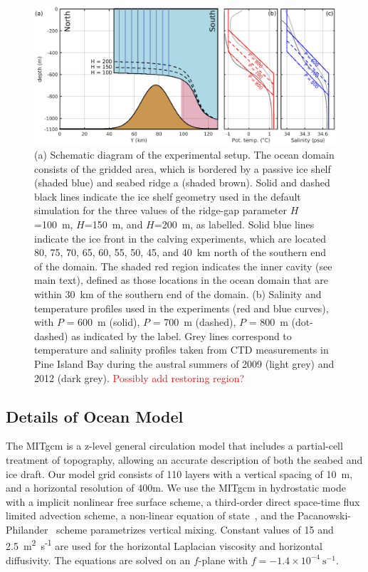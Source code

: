 \documentclass[draft]{agujournal2019}
\newcommand{\red}[1]{\textcolor{red}{#1}}
\begin{document}
\begin{figure}
    \centering
    \includegraphics[width = \textwidth]{../make_figures/plots/figure2.eps}
    \caption{(a) Schematic diagram of the experimental setup. The ocean domain consists of the gridded area, which is bordered by a passive ice shelf (shaded blue) and seabed ridge a (shaded brown). Solid and dashed black lines indicate the ice shelf geometry used in the default simulation for the three values of the ridge-gap parameter $H$=100~m, $H$=150~m, and $H$=200~m, as labelled. Solid blue lines indicate the ice front in the calving experiments, which are located 80, 75, 70, 65, 60, 55, 50, 45, and 40~km north of the southern end of the domain. The shaded red region indicates the inner cavity (see main text), defined as those locations in the ocean domain that are within 30~km of the southern end of the domain. (b) Salinity and temperature profiles used in the experiments (red and blue curves), with $P$ = 600~m (solid), $P$ = 700~m (dashed), $P$ = 800~m (dot-dashed) as indicated by the label. Grey lines correspond to temperature and salinity profiles taken from CTD measurements in Pine Island Bay during the austral summers of 2009 (light grey) and 2012 (dark grey).  \red{Possibly add restoring region?}}
    \label{fig:figure2}
\end{figure}

\subsection{Details of Ocean Model}\label{S:Experiment:Model}
The MITgcm is a z-level general circulation model that includes a partial-cell treatment of topography, allowing an accurate description of both the seabed and ice draft. Our model grid consists of 110 layers with a vertical spacing of 10~m, and a horizontal resolution of 400m. We use the MITgcm in hydrostatic mode with a implicit nonlinear free surface scheme, a third-order direct space-time flux limited advection scheme, a non-linear equation of state~, and the Pacanowski-Philander~\cite{Pacanowski1981JPhysOcean} scheme parametrizes vertical mixing. Constant values of 15 and 2.5~m\textsuperscript{2}~s\textsuperscript{-1} are used for the horizontal Laplacian viscosity and horizontal diffusivity. The equations are solved on an $f$-plane with $f = -1.4\times10^{-4}~\text{s}^{-1}$.
\end{document}
